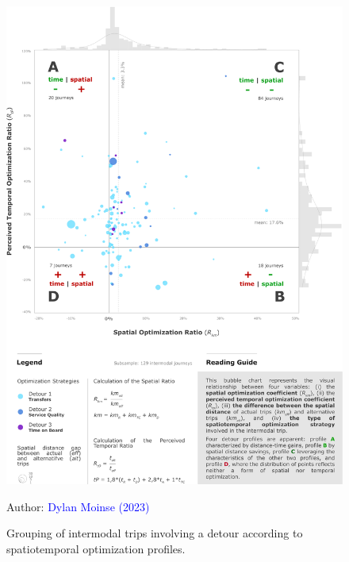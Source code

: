 \begin{refsegment}
    \begin{figure}[h!]\vspace*{4pt}
        \caption{Grouping of intermodal trips involving a detour according to spatiotemporal optimization profiles.}
        \label{fig-chap5:profils-strategies-optimisation-detours}
        \centerline{\includegraphics[width=1\columnwidth]{src/Figures/Chap-5/EN_Detours_Cluster_optimisation_detours.pdf}}
        \vspace{5pt}
        \begin{flushright}\scriptsize{
        Author: \textcolor{blue}{Dylan Moinse (2023)}
        }\end{flushright}
    \end{figure}
    

\end{refsegment}
